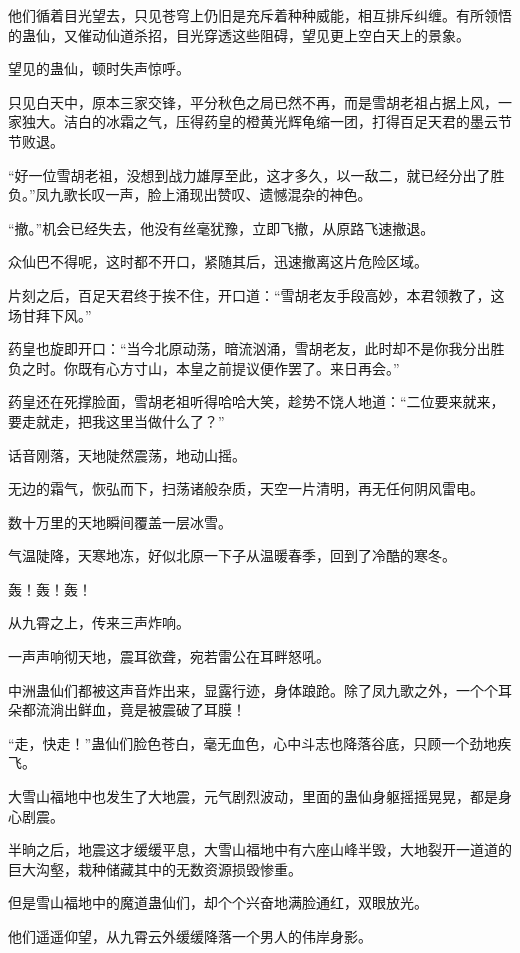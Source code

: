 \begin{this_body}
他们循着目光望去，只见苍穹上仍旧是充斥着种种威能，相互排斥纠缠。有所领悟的蛊仙，又催动仙道杀招，目光穿透这些阻碍，望见更上空白天上的景象。

望见的蛊仙，顿时失声惊呼。

只见白天中，原本三家交锋，平分秋色之局已然不再，而是雪胡老祖占据上风，一家独大。洁白的冰霜之气，压得药皇的橙黄光辉龟缩一团，打得百足天君的墨云节节败退。

“好一位雪胡老祖，没想到战力雄厚至此，这才多久，以一敌二，就已经分出了胜负。”凤九歌长叹一声，脸上涌现出赞叹、遗憾混杂的神色。

“撤。”机会已经失去，他没有丝毫犹豫，立即飞撤，从原路飞速撤退。

众仙巴不得呢，这时都不开口，紧随其后，迅速撤离这片危险区域。

片刻之后，百足天君终于挨不住，开口道：“雪胡老友手段高妙，本君领教了，这场甘拜下风。”

药皇也旋即开口：“当今北原动荡，暗流汹涌，雪胡老友，此时却不是你我分出胜负之时。你既有心方寸山，本皇之前提议便作罢了。来日再会。”

药皇还在死撑脸面，雪胡老祖听得哈哈大笑，趁势不饶人地道：“二位要来就来，要走就走，把我这里当做什么了？”

话音刚落，天地陡然震荡，地动山摇。

无边的霜气，恢弘而下，扫荡诸般杂质，天空一片清明，再无任何阴风雷电。

数十万里的天地瞬间覆盖一层冰雪。

气温陡降，天寒地冻，好似北原一下子从温暖春季，回到了冷酷的寒冬。

轰！轰！轰！

从九霄之上，传来三声炸响。

一声声响彻天地，震耳欲聋，宛若雷公在耳畔怒吼。

中洲蛊仙们都被这声音炸出来，显露行迹，身体踉跄。除了凤九歌之外，一个个耳朵都流淌出鲜血，竟是被震破了耳膜！

“走，快走！”蛊仙们脸色苍白，毫无血色，心中斗志也降落谷底，只顾一个劲地疾飞。

大雪山福地中也发生了大地震，元气剧烈波动，里面的蛊仙身躯摇摇晃晃，都是身心剧震。

半晌之后，地震这才缓缓平息，大雪山福地中有六座山峰半毁，大地裂开一道道的巨大沟壑，栽种储藏其中的无数资源损毁惨重。

但是雪山福地中的魔道蛊仙们，却个个兴奋地满脸通红，双眼放光。

他们遥遥仰望，从九霄云外缓缓降落一个男人的伟岸身影。


\end{this_body}
